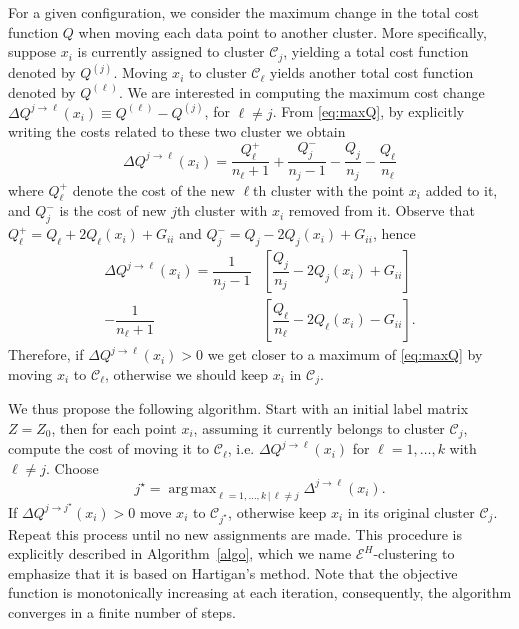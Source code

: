 \documentclass[twoside]{article}
\DeclareMathOperator*{\argmax}{arg\,max}
\newcommand\C{{\mathcal{C}}}
\begin{document}
For a given configuration, we consider the maximum change
in the total cost function $Q$ when moving each data point to
another cluster. More specifically, 
suppose $x_i$
is currently assigned to  cluster $\C_j$, yielding
a total cost function denoted by $Q^{(j)}$.
Moving $x_i$ to cluster $\C_\ell$ yields another total cost function
denoted by $Q^{(\ell)}$. We are interested in computing the maximum 
cost change
$\Delta Q^{j\to \ell} (x_i) \equiv Q^{(\ell)} - Q^{(j)}$, for $\ell\ne j$. 
From \eqref{eq:maxQ}, by explicitly writing the costs related to these 
two cluster we obtain
\begin{equation}
\Delta Q^{j\to \ell} (x_i) = \dfrac{Q_\ell^{+}}{n_\ell+1} + 
\dfrac{Q_j^-}{n_j-1} - \dfrac{Q_j}{n_j} - \dfrac{Q_\ell}{n_\ell}
\end{equation}
where $Q^{+}_\ell$ denote the cost of the new $\ell$th cluster
with the point $x_i$ added to it, and $Q^-_j$ is the cost of new 
$j$th cluster with $x_i$ removed from it. Observe that 
$Q_\ell^{+} = Q_\ell + 2 Q_\ell(x_i) + G_{ii}$ and
$Q_j^{-} = Q_j - 2 Q_j(x_i) + G_{ii}$, hence
\begin{equation}
\label{eq:changeQ}
\begin{split}
\Delta Q^{j \to \ell}(x_i)  = 
\dfrac{1}{n_j - 1} & \left[ \dfrac{Q_j}{n_j} - 2 Q_j(x_i) + G_{ii} \right] \\
- \dfrac{1}{n_\ell + 1}&\left[ \dfrac{Q_\ell}{n_\ell} - 2 Q_\ell(x_i) 
- G_{ii} \right].
\end{split}
\end{equation}
Therefore, if $\Delta Q^{j\to \ell}(x_i) > 0$ we get closer to a 
maximum of \eqref{eq:maxQ} by
moving $x_i$ to $\C_\ell$, otherwise we should keep $x_i$ in $\C_j$. 

We thus propose the following algorithm.
Start with an initial label matrix $Z=Z_0$, 
then for each point $x_i$, assuming it currently belongs to cluster
$\C_j$, compute the cost of moving it to $\C_\ell$, i.e.
$\Delta Q^{j\to \ell}(x_i)$ for 
$\ell=1,\dots,k$ with $\ell \ne j$. Choose
\begin{equation}
j^\star = \argmax_{\ell=1,\dotsc,k \, | \, \ell\ne j} 
\Delta^{j \to \ell}(x_i).
\end{equation}
If $\Delta Q^{j \to j^\star}(x_i) > 0$ move $x_i$ to $\C_{j^\star}$, 
otherwise keep $x_i$ in its original cluster $\C_j$. 
Repeat this process until no new assignments are made.
This procedure is explicitly described in Algorithm~\ref{algo}, 
which we name $\mathcal{E}^H$-clustering to emphasize that it is based on
Hartigan's method.
Note that the objective function is
monotonically increasing at each iteration, consequently, the algorithm
converges in a finite number of steps.
\end{document}
